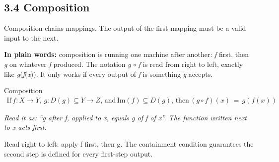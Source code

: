 \documentclass[11pt]{article}
\begin{document}
\begin{keepsection}
\section{3.4 Composition}

Composition chains mappings. The output of the first mapping must be a valid input to the next.

\begin{plainbox}\textbf{In plain words:} composition is running one machine after another: \textit{f} first, then \textit{g} on whatever \textit{f} produced. The notation \textit{g} \ensuremath{\circ} \textit{f} is read from right to left, exactly like \textit{g}(\textit{f}(\textit{x})). It only works if every output of \textit{f} is something \textit{g} accepts.\end{plainbox}

\begin{equationcard}{Composition}
\[ \begin{gathered} \text{If}\, {f}:{X}\to {Y},\, {g}:{D}({g})⊆{Y}\to {Z},\, \text{and}\, \text{Im}({f})⊆{D}({g}),\, \text{then}\, ({g}\circ {f})({x})\, =\, {g}({f}({x})) \end{gathered} \]
{\small \emph{Read it as: “g after f, applied to x, equals g of f of x”. The function written next to x acts first.}\par Read right to left: apply f first, then g. The containment condition guarantees the second step is defined for every first-step output.}
\end{equationcard}


\end{keepsection}
\end{document}
